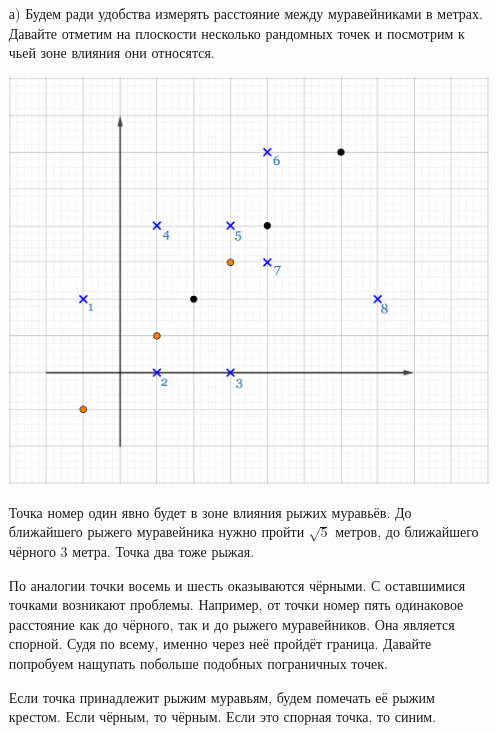\documentclass[12pt, a4paper, oneside]{article}
\theoremstyle{plain} %
\theoremstyle{definition}
\begin{document}
\begin{solution} 
\begin{enumerate}
	\item[а)]  Будем ради удобства измерять расстояние между муравейниками в метрах. Давайте отметим на плоскости несколько рандомных точек и посмотрим к чьей зоне влияния они относятся. 
	
	\begin{center}
	    \includegraphics[scale=0.18]{2knn_1.png}
	\end{center} 
	
    Точка номер один явно будет в зоне влияния рыжих муравьёв. До ближайшего рыжего муравейника нужно пройти $\sqrt{5}$ метров, до ближайшего чёрного $3$ метра.  Точка два тоже рыжая. 
	
    По аналогии точки восемь и шесть оказываются чёрными. С оставшимися точками возникают проблемы. Например, от точки номер пять одинаковое расстояние как до чёрного, так и до рыжего муравейников. Она является спорной. Судя по всему, именно через неё пройдёт граница. Давайте попробуем нащупать побольше подобных пограничных точек. 
	
	Если точка принадлежит рыжим муравьям, будем помечать её рыжим крестом. Если чёрным, то чёрным. Если это спорная точка, то синим. 
	

\end{enumerate}
\end{solution}
\end{document}
